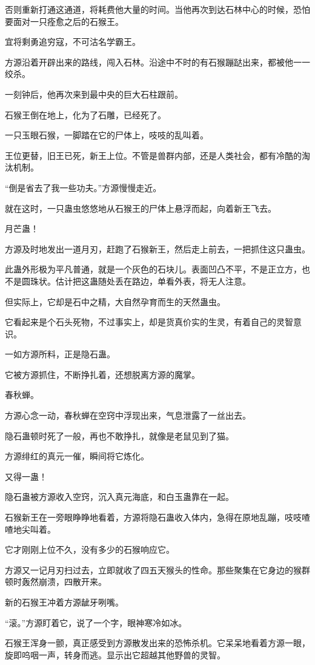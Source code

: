 \begin{this_body}
否则重新打通这通道，将耗费他大量的时间。当他再次到达石林中心的时候，恐怕要面对一只痊愈之后的石猴王。

宜将剩勇追穷寇，不可沽名学霸王。

方源沿着开辟出来的路线，闯入石林。沿途中不时的有石猴蹦跶出来，都被他一一绞杀。

一刻钟后，他再次来到最中央的巨大石柱跟前。

石猴王倒在地上，化为了石雕，已经死了。

一只玉眼石猴，一脚踏在它的尸体上，吱吱的乱叫着。

王位更替，旧王已死，新王上位。不管是兽群内部，还是人类社会，都有冷酷的淘汰机制。

“倒是省去了我一些功夫。”方源慢慢走近。

就在这时，一只蛊虫悠悠地从石猴王的尸体上悬浮而起，向着新王飞去。

月芒蛊！

方源及时地发出一道月刃，赶跑了石猴新王，然后走上前去，一把抓住这只蛊虫。

此蛊外形极为平凡普通，就是一个灰色的石块儿。表面凹凸不平，不是正立方，也不是圆珠状。估计把这蛊随处丢在路边，单看外表，将无人注意。

但实际上，它却是石中之精，大自然孕育而生的天然蛊虫。

它看起来是个石头死物，不过事实上，却是货真价实的生灵，有着自己的灵智意识。

一如方源所料，正是隐石蛊。

它被方源抓住，不断挣扎着，还想脱离方源的魔掌。

春秋蝉。

方源心念一动，春秋蝉在空窍中浮现出来，气息泄露了一丝出去。

隐石蛊顿时死了一般，再也不敢挣扎，就像是老鼠见到了猫。

方源绯红的真元一催，瞬间将它炼化。

又得一蛊！

隐石蛊被方源收入空窍，沉入真元海底，和白玉蛊靠在一起。

石猴新王在一旁眼睁睁地看着，方源将隐石蛊收入体内，急得在原地乱蹦，吱吱喳喳地尖叫着。

它才刚刚上位不久，没有多少的石猴响应它。

方源又一记月刃扫过去，立即就收了四五天猴头的性命。那些聚集在它身边的猴群顿时轰然崩溃，四散开来。

新的石猴王冲着方源龇牙咧嘴。

“滚。”方源盯着它，说了一个字，眼神寒冷如冰。

石猴王浑身一颤，真正感受到方源散发出来的恐怖杀机。它呆呆地看着方源一眼，旋即呜咽一声，转身而逃。显示出它超越其他野兽的灵智。


\end{this_body}

